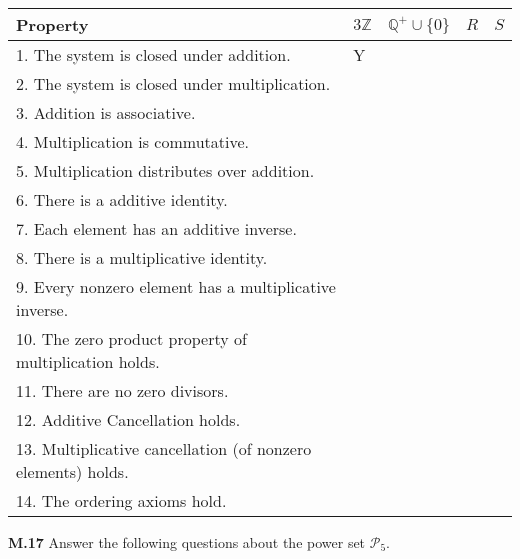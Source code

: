 \documentclass[addpoints]{exam}
\begin{document}
\begin{questions}
\begin{tabular}{lllll}
\toprule
Property                                                                       & $3\mathbb{Z}$ & $\mathbb{Q}^+\cup\{0\}$ & $R$ & $S$\\ \midrule
1. The system is closed under addition.   &  Y  &   &   &  \\ 
2. The system is closed under multiplication. &   &   &   &  \\  
3. Addition is associative.  &   &   &   &  \\ 
4. Multiplication is commutative.  &   &   &   &  \\ 
5. Multiplication distributes over addition.  &   &   &   &  \\  
6. There is a additive identity. &   &   &   &  \\ 
7. Each element has an additive inverse. &   &   &   &  \\  
8. There is a multiplicative identity. &   &   &   &  \\ 
9. Every nonzero element has a multiplicative inverse. &   &   &   &  \\ 
10. The zero product property of multiplication holds. &   &   &   &  \\ 
11. There are no zero divisors. &   &   &   &  \\ 
12. Additive Cancellation holds. &   &   &   &  \\  
13. Multiplicative cancellation (of nonzero elements) holds. &   &   &   &  \\ 
14. The ordering axioms hold.&   &   &   &  \\  \bottomrule
\end{tabular}


\question \textbf{M.17}
Answer the following questions about the power set $\mathcal{P}_5$.





\end{questions}
\end{document}
